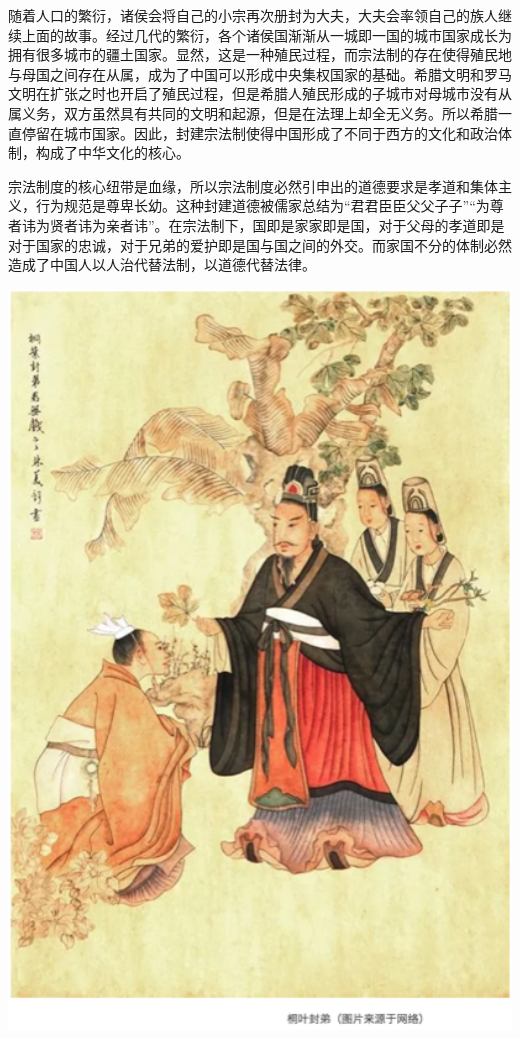 \documentclass[]{book}
\begin{document}
随着人口的繁衍，诸侯会将自己的小宗再次册封为大夫，大夫会率领自己的族人继续上面的故事。经过几代的繁衍，各个诸侯国渐渐从一城即一国的城市国家成长为拥有很多城市的疆土国家。显然，这是一种殖民过程，而宗法制的存在使得殖民地与母国之间存在从属，成为了中国可以形成中央集权国家的基础。希腊文明和罗马文明在扩张之时也开启了殖民过程，但是希腊人殖民形成的子城市对母城市没有从属义务，双方虽然具有共同的文明和起源，但是在法理上却全无义务。所以希腊一直停留在城市国家。因此，封建宗法制使得中国形成了不同于西方的文化和政治体制，构成了中华文化的核心。

宗法制度的核心纽带是血缘，所以宗法制度必然引申出的道德要求是孝道和集体主义，行为规范是尊卑长幼。这种封建道德被儒家总结为``君君臣臣父父子子''``为尊者讳为贤者讳为亲者讳''。在宗法制下，国即是家家即是国，对于父母的孝道即是对于国家的忠诚，对于兄弟的爱护即是国与国之间的外交。而家国不分的体制必然造成了中国人以人治代替法制，以道德代替法律。

\includegraphics[width=5.67in]{images/gx3}
\end{document}

